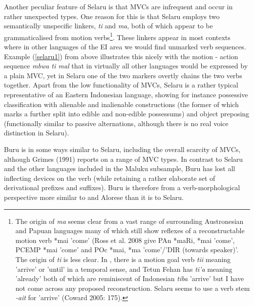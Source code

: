 Another peculiar feature of Selaru is that MVCs are infrequent and occur in rather unexpected types. One reason for this is that Selaru employs two semantically unspecific linkers, \textit{ti} and \textit{ma}, both of which appear to be grammaticalised from motion verbs\footnote{The origin of \textit{ma} seems clear from a vast range of surrounding Austronesian and Papuan languages many of which still show reflexes of a reconstructable motion verb *mai 'come' (Ross et al. 2008 give PAn *maRi, *mai 'come', PCEMP *mai 'come' and POc *mai, *ma 'come'/'DIR (towards speaker)'. The origin of \textit{ti} is less clear. In , there is a motion goal verb \textit{tii} meaning 'arrive' or 'until' in a temporal sense, and Tetun Fehan has \textit{ti'a} meaning 'already' both of which are reminiscent of Indonesian \textit{tiba} 'arrive' but I have not come across any proposed reconstruction. Selaru seems to use a verb stem \textit{-ait} for 'arrive' (Coward 2005: 175).}. These linkers appear in most contexts where in other languages of the EI area we would find unmarked verb sequences. Example (\ref{selaru1}) from above illustrates this nicely with the motion - action sequence \textit{mbwa ti mal} that in virtually all other languages would be expressed by a plain MVC, yet in Selaru one of the two markers overtly chains the two verbs together. Apart from the low functionality of MVCs, Selaru is a rather typical representative of an Eastern Indonesian language, showing for instance possessive classification with alienable and inalienable constructions (the former of which marks a further split into edible and non-edible possessums) and object preposing (functionally similar to passive alternations, although there is no real voice distinction in Selaru). 

Buru is in some ways similar to Selaru, including the overall scarcity of MVCs, although Grimes (1991) reports on a range of MVC types. In contrast to Selaru and the other languages included in the Maluku subsample, Buru has lost all inflecting devices on the verb (while retaining a rather elaborate set of derivational prefixes and suffixes). Buru is therefore from a verb-morphological perspective more similar to  and Alorese than it is to Selaru.

